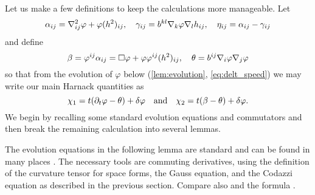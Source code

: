 \documentclass{amsart}
\begin{document}
Let us make a few definitions to keep the calculations more manageable. Let
\[
\alpha_{ij} = \nabla^2_{ij} \varphi + \varphi(h^2)_{ij}, \quad \gamma_{ij} = b^{kl} \nabla_k \varphi \nabla_l h_{ij}, \quad \eta_{ij} = \alpha_{ij} - \gamma_{ij}
\]
and define
\[
\beta = \varphi^{ij} \alpha_{ij} = \Box\varphi + \varphi \varphi^{ij}(h^2)_{ij}, \quad \theta =  b^{ij} \nabla_i \varphi \nabla_j \varphi
\]
so that from the evolution of \(\varphi\) below (\cref{lem:evolution}, \cref{eq:delt_speed}) we may write our main Harnack quantities as
\[
\chi_1 = t(\partial_t\varphi- \theta) + \delta\varphi
\quad \mbox{and}\quad
\chi_2 = t(\beta - \theta) + \delta\varphi.
\]
We begin by recalling some standard evolution equations and commutators and then break the remaining calculation into several lemmas.

The evolution equations in the following lemma are standard and can be found in many places \cite{Andrews:09/1994, Chow:06/1991, Hamilton:/1995, Huisken:/1987a, Smoczyk:/1997}. The necessary tools are commuting derivatives, using the definition of the curvature tensor for space forms, the Gauss equation, and the Codazzi equation as described in the previous section. Compare also \cite[p.~94-95]{Gerhardt:/2006} and the formula \cite[eq.~(6.17)]{Gerhardt:01/1996}.
\end{document}
